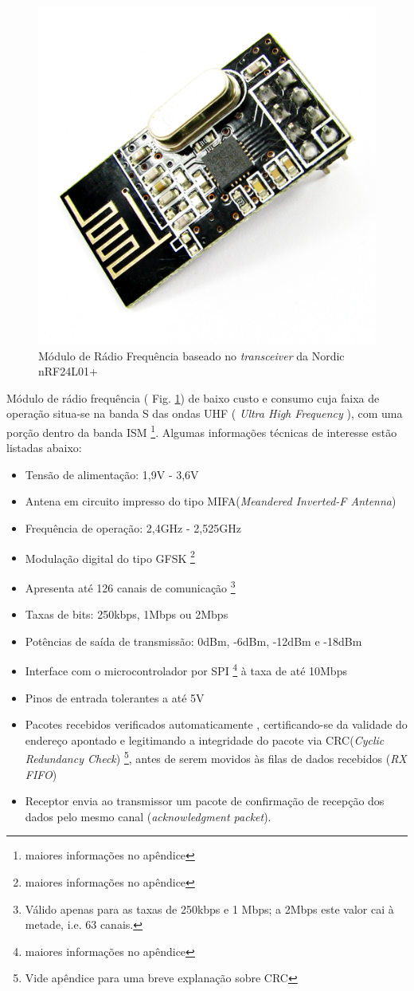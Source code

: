   \begin{figure}[!htb] %
    \centering
    \includegraphics[width=0.7\linewidth]{../../Imagens/nordicc.png}
    \caption{Módulo de Rádio Frequência baseado no \textit{transceiver} da Nordic nRF24L01+}
    \label{Nordic}
  \end{figure}
Módulo de rádio frequência ( Fig. \ref{Nordic}) de baixo custo e consumo cuja faixa de operação situa-se na banda S das ondas UHF ( \textit{Ultra 
High Frequency} ), com uma porção dentro da banda ISM \footnote{maiores informações no apêndice}.
Algumas informações técnicas \cite{nRF} de interesse estão listadas abaixo: 
\begin{itemize}
 \item Tensão de alimentação: 1,9V - 3,6V
 \item Antena em circuito impresso do tipo MIFA(\textit{Meandered Inverted-F Antenna}) \cite{MIFA}
 \item Frequência de operação: 2,4GHz - 2,525GHz
 \item Modulação digital do tipo GFSK \footnote{maiores informações no apêndice}
 \item Apresenta até 126 canais de comunicação \footnote{Válido apenas para as taxas de 250kbps e 1 Mbps; a 2Mbps este valor cai à metade, i.e. 63 
canais.}
 \item Taxas de bits: 250kbps, 1Mbps ou 2Mbps
 \item Potências de saída de transmissão: 0dBm, -6dBm, -12dBm e -18dBm
 \item Interface com o microcontrolador por SPI \footnote{maiores informações no apêndice} à taxa de até 10Mbps
 \item Pinos de entrada tolerantes a até 5V
 \item 
Pacotes recebidos verificados automaticamente , certificando-se da validade do endereço apontado e legitimando a integridade 
do pacote via CRC(\textit{Cyclic Redundancy Check}) \footnote{Vide apêndice para uma breve explanação sobre CRC}, antes de 
serem movidos às filas de dados recebidos (\textit{RX FIFO})
 \item Receptor envia ao transmissor um pacote de confirmação de recepção dos dados pelo mesmo canal (\textit{acknowledgment packet}).
\end{itemize}


